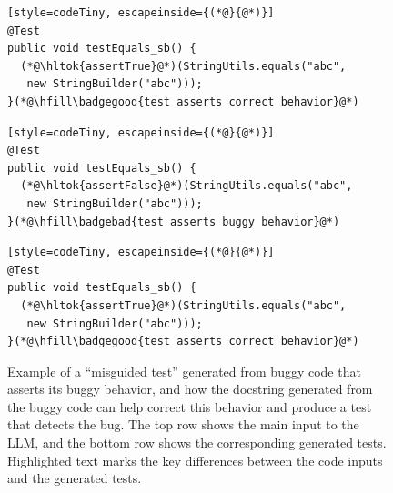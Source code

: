 \documentclass[acmsmall]{acmart}
\newcommand{\badgebad}[1]{%
    \tcbox[
        on line,
        colback=red!16,
        colframe=red!18,
        boxrule=0.2pt,
        arc=1pt,
        left=1pt,
        right=1pt,
        top=0.25pt,
        bottom=0.25pt,
        boxsep=0pt
    ]{\sffamily\tiny\color{red!75!black}#1 \ding{55}}%
}
\newcommand{\badgegood}[1]{%
    \tcbox[
        on line,
        colback=green!16,
        colframe=green!20,
        boxrule=0.2pt,
        arc=1pt,
        left=1pt,
        right=1pt,
        top=0.25pt,
        bottom=0.25pt,
        boxsep=0pt
    ]{\sffamily\tiny\color{green!45!black}#1 \ding{51}}%
}
\newcommand{\hltok}[1]{%
  \begingroup
    \setlength{\fboxsep}{0.5pt}%
    \colorbox{bvfHL}{#1}%
  \endgroup
}
\begin{document}
\begin{figure}[htbp!]
\begin{minipage}{1.00\textwidth}
\vspace{1.0pt}

\begin{minipage}[t]{0.333\linewidth}
\begin{tcolorbox}[fixedbox, title=Test generated from bug-free method,
                  equal height group=row2]
\begin{lstlisting}[style=codeTiny, escapeinside={(*@}{@*)}]
@Test
public void testEquals_sb() {
  (*@\hltok{assertTrue}@*)(StringUtils.equals("abc",
   new StringBuilder("abc")));
}(*@\hfill\badgegood{test asserts correct behavior}@*)
\end{lstlisting}
\end{tcolorbox}
\end{minipage}%
\hfill
\begin{minipage}[t]{0.310\linewidth}
\begin{tcolorbox}[buggybox, title=Misguided Test,
                  equal height group=row2]
\begin{lstlisting}[style=codeTiny, escapeinside={(*@}{@*)}]
@Test
public void testEquals_sb() {
  (*@\hltok{assertFalse}@*)(StringUtils.equals("abc",
   new StringBuilder("abc")));
}(*@\hfill\badgebad{test asserts buggy behavior}@*)
\end{lstlisting}
\end{tcolorbox}
\end{minipage}%
\hfill
\begin{minipage}[t]{0.349\linewidth}
\begin{tcolorbox}[fixedbox, title=Test generated from only the docstring,
                  equal height group=row2]
\begin{lstlisting}[style=codeTiny, escapeinside={(*@}{@*)}]
@Test
public void testEquals_sb() {
  (*@\hltok{assertTrue}@*)(StringUtils.equals("abc",
   new StringBuilder("abc")));
}(*@\hfill\badgegood{test asserts correct behavior}@*)
\end{lstlisting}
\end{tcolorbox}
\end{minipage}

\end{minipage}
\vspace{-0.6em}
\caption{Example of a ``misguided test'' generated from buggy code that asserts its buggy behavior, and how the docstring generated from the buggy code can help correct this behavior and produce a test that detects the bug. The top row shows the main input to the LLM, and the bottom row shows the corresponding generated tests. Highlighted text marks the key differences between the code inputs and the generated tests.}
\label{fig:misguided_test_example}
\vspace{-0.8em}
\end{figure}
\end{document}
